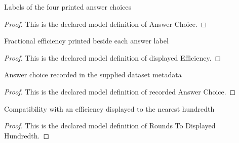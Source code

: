 \begin{definition}
  \label{def:physics:phyx-mini-0425:phyxminiproblems-problemphyxmini0425-answerchoice}
  Labels of the four printed answer choices
\end{definition}
\begin{proof}
  This is the declared model definition of Answer Choice.
\end{proof}
\begin{definition}
  \label{def:physics:phyx-mini-0425:phyxminiproblems-problemphyxmini0425-displayedefficiency}
  Fractional efficiency printed beside each answer label
\end{definition}
\begin{proof}
  This is the declared model definition of displayed Efficiency.
\end{proof}
\begin{definition}
  \label{def:physics:phyx-mini-0425:phyxminiproblems-problemphyxmini0425-recordedanswerchoice}
  Answer choice recorded in the supplied dataset metadata
\end{definition}
\begin{proof}
  This is the declared model definition of recorded Answer Choice.
\end{proof}
\begin{definition}
  \label{def:physics:phyx-mini-0425:phyxminiproblems-problemphyxmini0425-roundstodisplayedhundredth}
  Compatibility with an efficiency displayed to the nearest hundredth
\end{definition}
\begin{proof}
  This is the declared model definition of Rounds To Displayed Hundredth.
\end{proof}
